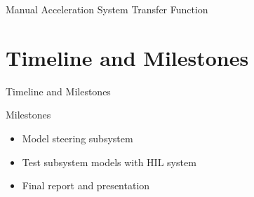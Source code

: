 \documentclass{beamer}
\begin{document}
\begin{frame}{Manual Acceleration System Transfer Function}
\end{frame}


\section{Timeline and Milestones}

\begin{frame}{Timeline and Milestones}
  \begin{block}{Milestones}
 \begin{itemize}
        \item Model steering subsystem 
	\item Test subsystem models with HIL system 
	\item Final report and presentation 
\end{itemize}
  \end{block}
\end{frame}


\end{document}
